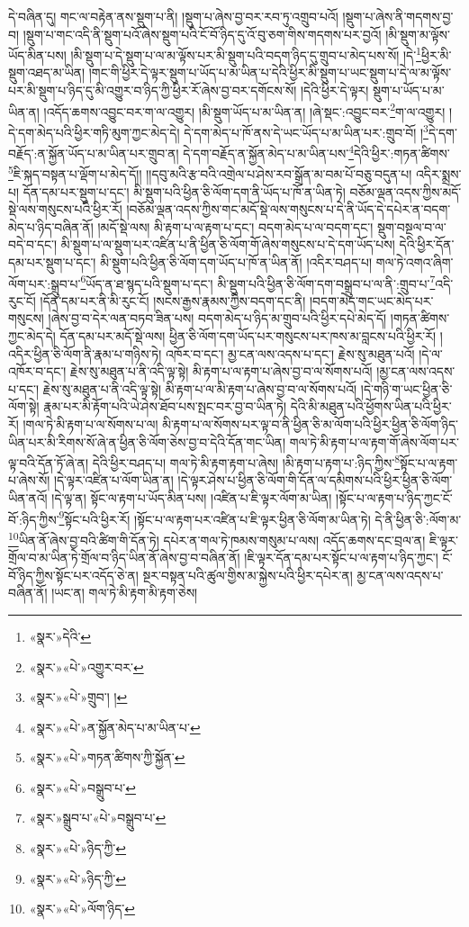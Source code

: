 དེ་བཞིན་དུ། གང་ལ་བརྟེན་ནས་སྡུག་པ་ནི། །སྡུག་པ་ཞེས་བྱ་བར་རབ་ཏུ་འགྲུབ་པའོ། །སྡུག་པ་ཞེས་ནི་གདགས་བྱ་བ། །སྡུག་པ་གང་འདི་ནི་སྡུག་པའོ་ཞེས་སྡུག་པའི་ངོ་བོ་ཉིད་དུ་འོ་བུ་ཅག་གིས་གདགས་པར་བྱའོ། །མི་སྡུག་མ་ལྟོས་ཡོད་མིན་པས། །མི་སྡུག་པ་དེ་སྡུག་པ་ལ་མ་ལྟོས་པར་མི་སྡུག་པའི་བདག་ཉིད་དུ་གྲུབ་པ་མེད་པས་སོ། །དེ་\footnote{«སྣར་»དེའི་}ཕྱིར་མི་སྡུག་འཐད་མ་ཡིན། །གང་གི་ཕྱིར་དེ་ལྟར་སྡུག་པ་ཡོད་པ་མ་ཡིན་པ་དེའི་ཕྱིར་མི་སྡུག་པ་ཡང་སྡུག་པ་དེ་ལ་མ་ལྟོས་པར་མི་སྡུག་པ་ཉིད་དུ་མི་འགྱུར་བ་ཉིད་ཀྱི་ཕྱིར་རོ་ཞེས་བྱ་བར་དགོངས་སོ། །དེའི་ཕྱིར་དེ་ལྟར། སྡུག་པ་ཡོད་པ་མ་ཡིན་ན། །འདོད་ཆགས་འབྱུང་བར་ག་ལ་འགྱུར། །མི་སྡུག་ཡོད་པ་མ་ཡིན་ན། །ཞེ་སྡང་:འབྱུང་བར་\footnote{«སྣར་»«པེ་»འགྱུར་བར་}ག་ལ་འགྱུར། །དེ་དག་མེད་པའི་ཕྱིར་གཏི་མུག་ཀྱང་མེད་དེ། དེ་དག་མེད་པ་ཁོ་ནས་དེ་ཡང་ཡོད་པ་མ་ཡིན་པར་:གྲུབ་བོ། །\footnote{«སྣར་»«པེ་»གྲུབ་། ། }དེ་དག་བརྗོད་:ན་སྐྱོན་ཡོད་པ་མ་ཡིན་པར་གྲུབ་ན། དེ་དག་བརྗོད་ན་སྐྱོན་མེད་པ་མ་ཡིན་པས་\footnote{«སྣར་»«པེ་»ན་སྐྱོན་མེད་པ་མ་ཡིན་པ་}དེའི་ཕྱིར་:གཏན་ཚིགས་\footnote{«སྣར་»«པེ་»གཏན་ཚིགས་ཀྱི་སྐྱོན་}ཇི་སྐད་བསྟན་པ་ལྡོག་པ་མེད་དོ།། །།དབུ་མའི་རྩ་བའི་འགྲེལ་པ་ཤེས་རབ་སྒྲོན་མ་བམ་པོ་བཅུ་བདུན་པ། འདིར་སྨྲས་པ། དོན་དམ་པར་སྡུག་པ་དང་། མི་སྡུག་པའི་ཕྱིན་ཅི་ལོག་དག་ནི་ཡོད་པ་ཁོ་ན་ཡིན་ཏེ། བཅོམ་ལྡན་འདས་ཀྱིས་མདོ་སྡེ་ལས་གསུངས་པའི་ཕྱིར་རོ། །བཅོམ་ལྡན་འདས་ཀྱིས་གང་མདོ་སྡེ་ལས་གསུངས་པ་དེ་ནི་ཡོད་དེ་དཔེར་ན་བདག་མེད་པ་ཉིད་བཞིན་ནོ། །མདོ་སྡེ་ལས། མི་རྟག་པ་ལ་རྟག་པ་དང་། བདག་མེད་པ་ལ་བདག་དང་། སྡུག་བསྔལ་བ་ལ་བདེ་བ་དང་། མི་སྡུག་པ་ལ་སྡུག་པར་འཛིན་པ་ནི་ཕྱིན་ཅི་ལོག་གོ་ཞེས་གསུངས་པ་དེ་དག་ཡོད་པས། དེའི་ཕྱིར་དོན་དམ་པར་སྡུག་པ་དང་། མི་སྡུག་པའི་ཕྱིན་ཅི་ལོག་དག་ཡོད་པ་ཁོ་ན་ཡིན་ནོ། །འདིར་བཤད་པ། གལ་ཏེ་འགའ་ཞིག་ལོག་པར་:སྒྲུབ་པ་\footnote{«སྣར་»«པེ་»བསྒྲུབ་པ་}ཡོད་ན་ཐ་སྙད་པའི་སྡུག་པ་དང་། མི་སྡུག་པའི་ཕྱིན་ཅི་ལོག་དག་བསྒྲུབ་པ་ལ་ནི་:གྲུབ་པ་\footnote{«སྣར་»སྒྲུབ་པ་«པེ་»བསྒྲུབ་པ་}འདི་རུང་ངོ། །དོན་དམ་པར་ནི་མི་རུང་ངོ། །སངས་རྒྱས་རྣམས་ཀྱིས་བདག་དང་ནི། །བདག་མེད་གང་ཡང་མེད་པར་གསུངས། །ཞེས་བྱ་བ་དེར་ལན་བཏབ་ཟིན་པས། བདག་མེད་པ་ཉིད་མ་གྲུབ་པའི་ཕྱིར་དཔེ་མེད་དོ། །གཏན་ཚིགས་ཀྱང་མེད་དེ། དོན་དམ་པར་མདོ་སྡེ་ལས། ཕྱིན་ཅི་ལོག་དག་ཡོད་པར་གསུངས་པར་ཁས་མ་བླངས་པའི་ཕྱིར་རོ། །འདིར་ཕྱིན་ཅི་ལོག་ནི་རྣམ་པ་གཉིས་ཏེ། འཁོར་བ་དང་། མྱ་ངན་ལས་འདས་པ་དང་། རྗེས་སུ་མཐུན་པའོ། །དེ་ལ་འཁོར་བ་དང་། རྗེས་སུ་མཐུན་པ་ནི་འདི་ལྟ་སྟེ། མི་རྟག་པ་ལ་རྟག་པ་ཞེས་བྱ་བ་ལ་སོགས་པའོ། །མྱ་ངན་ལས་འདས་པ་དང་། རྗེས་སུ་མཐུན་པ་ནི་འདི་ལྟ་སྟེ། མི་རྟག་པ་ལ་མི་རྟག་པ་ཞེས་བྱ་བ་ལ་སོགས་པའོ། །དེ་གཉི་ག་ཡང་ཕྱིན་ཅི་ལོག་སྟེ། རྣམ་པར་མི་རྟོག་པའི་ཡེ་ཤེས་ཐོབ་པས་སྤང་བར་བྱ་བ་ཡིན་ཏེ། དེའི་མི་མཐུན་པའི་ཕྱོགས་ཡིན་པའི་ཕྱིར་རོ། །གལ་ཏེ་མི་རྟག་པ་ལ་སོགས་པ་ལ། མི་རྟག་པ་ལ་སོགས་པར་ལྟ་བ་ནི་ཕྱིན་ཅི་མ་ལོག་པའི་ཕྱིར་ཕྱིན་ཅི་ལོག་ཉིད་ཡིན་པར་མི་རིགས་སོ་ཞེ་ན་ཕྱིན་ཅི་ལོག་ཅེས་བྱ་བ་དེའི་དོན་གང་ཡིན། གལ་ཏེ་མི་རྟག་པ་ལ་རྟག་གོ་ཞེས་ལོག་པར་ལྟ་བའི་དོན་ཏོ་ཞེ་ན། དེའི་ཕྱིར་བཤད་པ། གལ་ཏེ་མི་རྟག་རྟག་པ་ཞེས། །མི་རྟག་པ་རྟག་པ་:ཉིད་ཀྱིས་\footnote{«སྣར་»«པེ་»ཉིད་ཀྱི་}སྟོང་པ་ལ་རྟག་པ་ཞེས་སོ། །དེ་ལྟར་འཛིན་པ་ལོག་ཡིན་ན། །དེ་ལྟར་ཤེས་པ་ཕྱིན་ཅི་ལོག་གི་དོན་ལ་དམིགས་པའི་ཕྱིར་ཕྱིན་ཅི་ལོག་ཡིན་ནའོ། །དེ་ལྟ་ན། སྟོང་ལ་རྟག་པ་ཡོད་མིན་པས། །འཛིན་པ་ཇི་ལྟར་ལོག་མ་ཡིན། །སྟོང་པ་ལ་རྟག་པ་ཉིད་ཀྱང་ངོ་བོ་:ཉིད་ཀྱིས་\footnote{«སྣར་»«པེ་»ཉིད་ཀྱི་}སྟོང་པའི་ཕྱིར་རོ། །སྟོང་པ་ལ་རྟག་པར་འཛིན་པ་ཇི་ལྟར་ཕྱིན་ཅི་ལོག་མ་ཡིན་ཏེ། དེ་ནི་ཕྱིན་ཅི་:ལོག་མ་\footnote{«སྣར་»«པེ་»ལོག་ཉིད་}ཡིན་ནོ་ཞེས་བྱ་བའི་ཚིག་གི་དོན་ཏེ། དཔེར་ན་གལ་ཏེ་ཁམས་གསུམ་པ་ལས། འདོད་ཆགས་དང་བྲལ་ན། ཇི་ལྟར་གྲོལ་བ་མ་ཡིན་ཏེ་གྲོལ་བ་ཉིད་ཡིན་ནོ་ཞེས་བྱ་བ་བཞིན་ནོ། །ཇི་ལྟར་དོན་དམ་པར་སྟོང་པ་ལ་རྟག་པ་ཉིད་ཀྱང་། ངོ་བོ་ཉིད་ཀྱིས་སྟོང་པར་འདོད་ཅེ་ན། སྔར་བསྟན་པའི་ཚུལ་གྱིས་མ་སྐྱེས་པའི་ཕྱིར་དཔེར་ན། མྱ་ངན་ལས་འདས་པ་བཞིན་ནོ། །ཡང་ན། གལ་ཏེ་མི་རྟག་མི་རྟག་ཅེས། 